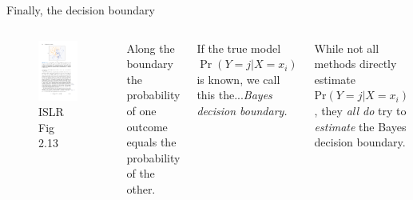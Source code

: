 \documentclass[aspectratio=169]{beamer}
\begin{document}
\begin{frame}{Finally, the decision boundary}
\begin{columns}
\begin{figure}
\includegraphics[width=\textwidth]{bayes_decision_boundary}
\caption*{ISLR Fig 2.13}
\end{figure}
Along the boundary the probability of one outcome equals the probability of the other.

\vspace{5mm}

If the true model  $\Pr(Y=j|X = x_i)$ is known, we call this the...\pause \textit{Bayes decision boundary.}

\vspace{5mm}

While not all methods directly estimate $\text{Pr}(Y=j|X = x_i)$, they \textit{all do} try to \textit{estimate} the Bayes decision boundary.  

\end{columns}
\end{frame}
\end{document}
